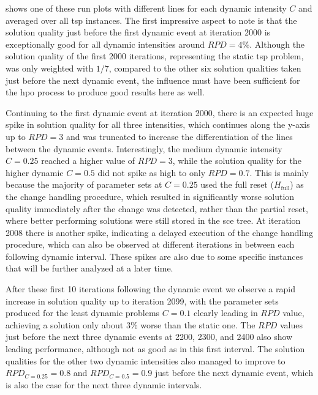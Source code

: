  shows one of these run plots with different lines for each dynamic intensity $C$ and averaged over all \gls{tsp} instances. The first impressive aspect to note is that the solution quality just before the first dynamic event at iteration 2000 is exceptionally good for all dynamic intensities around $RPD=4\%$. Although the solution quality of the first 2000 iterations, representing the static \gls{tsp} problem, was only weighted with $1/7$, compared to the other six solution qualities taken just before the next dynamic event, the influence must have been sufficient for the \gls{hpo} process to produce good results here as well. 

Continuing to the first dynamic event at iteration 2000, there is an expected huge spike in solution quality for all three intensities, which continues along the y-axis up to $RPD=3$ and was truncated to increase the differentiation of the lines between the dynamic events. Interestingly, the medium dynamic intensity $C=0.25$ reached a higher value of $RPD=3$, while the solution quality for the higher dynamic $C=0.5$ did not spike as high to only $RPD=0.7$. This is mainly because the majority of parameter sets at $C=0.25$ used the full reset ($H_\text{full}$) as the change handling procedure, which resulted in significantly worse solution quality immediately after the change was detected, rather than the partial reset, where better performing solutions were still stored in the \gls{sce} tree. At iteration 2008 there is another spike, indicating a delayed execution of the change handling procedure, which can also be observed at different iterations in between each following dynamic interval. These spikes are also due to some specific instances that will be further analyzed at a later time. 

After these first 10 iterations following the dynamic event we observe a rapid increase in solution quality up to iteration 2099, with the parameter sets produced for the least dynamic problems $C=0.1$ clearly leading in $RPD$ value, achieving a solution only about 3\% worse than the static one. The $RPD$ values just before the next three dynamic events at 2200, 2300, and 2400 also show leading performance, although not as good as in this first interval. The solution qualities for the other two dynamic intensities also managed to improve to $RPD_{C=0.25}=0.8$ and $RPD_{C=0.5}=0.9$ just before the next dynamic event, which is also the case for the next three dynamic intervals. 

